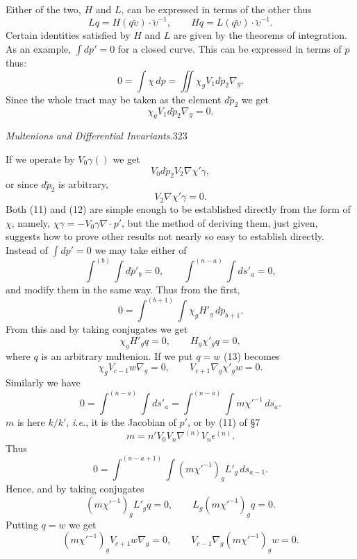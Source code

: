 \documentclass[11pt]{article}
\begin{document}
\indent Either of the two, $H$ and $L$, can be expressed in terms of the other thus
\begin{equation}Lq=H(q\breve{\upsilon})\cdot\breve{\upsilon}^{-1},\qquad Hq=L(q\breve{\upsilon})\cdot\breve{\upsilon}^{-1}.\tag{10}\end{equation}
Certain identities satisfied by $H$ and $L$ are given by the theorems of integration. As an example, $\int dp'=0$ for a closed curve. This can be expressed in terms of $p$ thus:
\[
0=\int\chi\,dp=\iint\chi_gV_1d\breve p_2\nabla_g.
\]
Since the whole tract may be taken as the element $d\breve p_2$ we get
\begin{equation}\chi_gV_1d\breve p_2\nabla_g=0.\tag{11}\end{equation}

\newpage\thispagestyle{empty}\begin{center}\textit{Multenions and Differential Invariants.}\hfill 323\end{center}
If we operate by $V_0\gamma()$ we get
\[
V_0d\breve p_2V_2\nabla\chi'\gamma,
\]
or since $d\breve p_2$ is arbitrary,
\begin{equation}V_2\nabla\chi'\gamma=0.\tag{12}\end{equation}
Both (11) and (12) are simple enough to be established directly from the form of $\chi$, namely, $\chi\gamma=-V_0\gamma\nabla\cdot p'$, but the method of deriving them, just given, suggests how to prove other results not nearly so easy to establish directly. Instead of $\int dp'=0$ we may take either of
\[
\int^{(b)}\!\int d\breve p'_b=0,\qquad
\int^{(n-a)}\!\int ds'_a=0,
\]
and modify them in the same way. Thus from the first,
\[
0=\int^{(b+1)}\!\int\chi_gH'_g\,d\breve p_{b+1}.
\]
From this and by taking conjugates we get
\begin{equation}\chi_gH'_gq=0,\qquad H_g\chi'_gq=0,\tag{13}\end{equation}
where $q$ is an arbitrary multenion. If we put $q=w$ (13) becomes
\begin{equation}\chi_gV_{c-1}w\nabla_g=0,\qquad V_{c+1}\nabla_g\chi'_gw=0.\tag{14}\end{equation}
Similarly we have
\[
0=\int^{(n-a)}\!\int ds'_a
 =\int^{(n-a)}\!\int m\chi'^{-1}\,ds_a.
\]
$m$ is here $k/k'$, \emph{i.e.}, it is the Jacobian of $p'$, or by (11) of §7
\[
m=n'V_0V_n\nabla^{(n)}V_n\epsilon^{(n)}.
\]
Thus
\[
0=\int^{(n-a+1)}\!\int(m\chi'^{-1})_gL'_g\,ds_{a-1}.
\]
Hence, and by taking conjugates
\begin{equation}(m\chi'^{-1})_gL'_gq=0,\qquad L_g(m\chi'^{-1})_gq=0.\tag{15}\end{equation}
Putting $q=w$ we get
\begin{equation}(m\chi'^{-1})_gV_{c+1}w\nabla_g=0,\qquad V_{c-1}\nabla_g(m\chi'^{-1})_gw=0.\tag{16}\end{equation}
\end{document}
